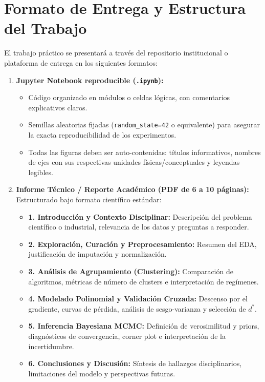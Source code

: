 \documentclass[11pt,a4paper]{article}
\begin{document}
\section{Formato de Entrega y Estructura del Trabajo}
\label{sec:entregables}

El trabajo práctico se presentará a través del repositorio institucional o plataforma de entrega en los siguientes formatos:
\begin{enumerate}[leftmargin=*,itemsep=2pt]
    \item \textbf{Jupyter Notebook reproducible (\texttt{.ipynb}):}
    \begin{itemize}[itemsep=1pt]
        \item Código organizado en módulos o celdas lógicas, con comentarios explicativos claros.
        \item Semillas aleatorias fijadas (\texttt{random\_state=42} o equivalente) para asegurar la exacta reproducibilidad de los experimentos.
        \item Todas las figuras deben ser auto-contenidas: títulos informativos, nombres de ejes con sus respectivas unidades físicas/conceptuales y leyendas legibles.
    \end{itemize}
    \item \textbf{Informe Técnico / Reporte Académico (PDF de 6 a 10 páginas):}
    Estructurado bajo formato científico estándar:
    \begin{itemize}[itemsep=1pt]
        \item \textbf{1. Introducción y Contexto Disciplinar:} Descripción del problema científico o industrial, relevancia de los datos y preguntas a responder.
        \item \textbf{2. Exploración, Curación y Preprocesamiento:} Resumen del EDA, justificación de imputación y normalización.
        \item \textbf{3. Análisis de Agrupamiento (Clustering):} Comparación de algoritmos, métricas de número de clusters e interpretación de regímenes.
        \item \textbf{4. Modelado Polinomial y Validación Cruzada:} Descenso por el gradiente, curvas de pérdida, análisis de sesgo-varianza y selección de $d^*$.
        \item \textbf{5. Inferencia Bayesiana MCMC:} Definición de verosimilitud y priors, diagnósticos de convergencia, corner plot e interpretación de la incertidumbre.
        \item \textbf{6. Conclusiones y Discusión:} Síntesis de hallazgos disciplinarios, limitaciones del modelo y perspectivas futuras.
    \end{itemize}
\end{enumerate}
\end{document}
